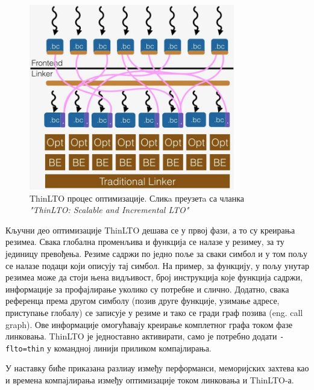 \documentclass[12pt,oneside]{memoir}
\begin{document}
\begin{figure}[!ht]
  \centering
  \includegraphics[width=0.8\textwidth]{LTO_thin.png}
  \caption{ThinLTO процес оптимизације. Сликa преузетa са чланка \textit{"ThinLTO: Scalable and Incremental LTO"}}
  \label{fig:grafikon}
\end{figure}

Кључни део оптимизације ThinLTO дешава се у првој фази, а то су креирања резимеа.
Свака глобална променљива и функција се налазе у резимеу, за ту јединицу превођења.
Резиме садржи по једно поље за сваки симбол и у том пољу
се налазе подаци који описују тај симбол.
На пример, за функцију, у пољу унутар резимеа може да стоји њена видљивост, 
број инструкција које функција садржи, информације за профајлирање уколико су потребне
и слично.
Додатно, свака референца према другом симболу (позив друге функције, узимање адресе,
приступање глобалу) се записује у резиме и тако се гради граф позива (eng. call graph).
Ове информације омогућавају креирање комплетног графа током фазе линковања.
ThinLTO је једноставно активирати, само је потребно додати  \texttt{-flto=thin} у командној линији
приликом компајлирања.

У наставку биће приказана разлиау између перформанси, меморијских захтева као и времена
компајлирања између оптимизације током линковања и ThinLTO-а.
\end{document}

